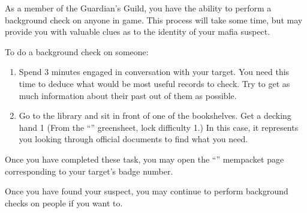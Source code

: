 \documentclass[green]{NeptuneBall}
\begin{document}
\name{\gBackground{}}

As a member of the Guardian's Guild, you have the ability to perform a background check on anyone in game. This process will take some time, but may provide you with valuable clues as to the identity of your mafia suspect.

To do a background check on someone:
\begin{enumerate}
\item Spend 3 minutes engaged in conversation with your target. You need this time to deduce what would be most useful records to check. Try to get as much information about their past out of them as possible.
\item Go to the library and sit in front of one of the bookshelves. Get a decking hand 1 (From the ``\gDecking{\MYname}'' greensheet, lock difficulty 1.) In this case, it represents you looking through official documents to find what you need.
\end{enumerate}

Once you have completed these task, you may open the ``\nMafia{\MYname}'' mempacket page corresponding to your target's badge number.

Once you have found your suspect, you may continue to perform background checks on people if you want to.
\end{document}
